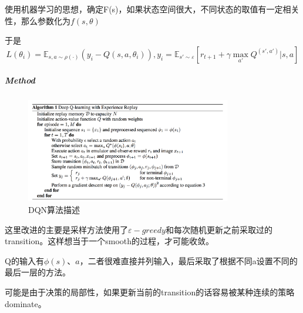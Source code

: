 \documentclass[a4paper]{article}
\begin{document}
使用机器学习的思想，确定F(s)，如果状态空间很大，不同状态的取值有一定相关性，那么参数化为$f(s,\theta)$

于是$$L(\theta_i) = \mathbb{E}_{s,a\sim \rho(\cdot)}(y_i - Q(s,a,\theta_i)), y_i = \mathbb{E}_{s'\sim \varepsilon}[r_{t+1} + \gamma\max\limits_{a'}Q^(s',a')|s,a]$$

\subparagraph{Method}

\begin{figure}
\centering
\includegraphics[width=0.8\textwidth]{./img/26.png}
\caption{DQN算法描述}
\label{fig:26}
\end{figure}
这里改进的主要是采样方法使用了$\varepsilon-greedy$和每次随机更新之前采取过的transition。这样想当于一个smooth的过程，才可能收敛。

Q的输入有$\phi(s)、a$，二者很难直接并列输入，最后采取了根据不同a设置不同的最后一层的方法。

可能是由于决策的局部性，如果更新当前的transition的话容易被某种连续的策略dominate。
\end{document}
